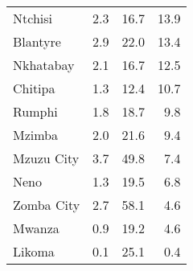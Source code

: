 \begin{tabular}{lrrr}
Ntchisi        &         2.3 &         16.7 &             13.9 \\
Blantyre       &         2.9 &         22.0 &             13.4 \\
Nkhatabay      &         2.1 &         16.7 &             12.5 \\
Chitipa        &         1.3 &         12.4 &             10.7 \\
Rumphi         &         1.8 &         18.7 &              9.8 \\
Mzimba         &         2.0 &         21.6 &              9.4 \\
Mzuzu City     &         3.7 &         49.8 &              7.4 \\
Neno           &         1.3 &         19.5 &              6.8 \\
Zomba City     &         2.7 &         58.1 &              4.6 \\
Mwanza         &         0.9 &         19.2 &              4.6 \\
Likoma         &         0.1 &         25.1 &              0.4 \\
\bottomrule
\end{tabular}
